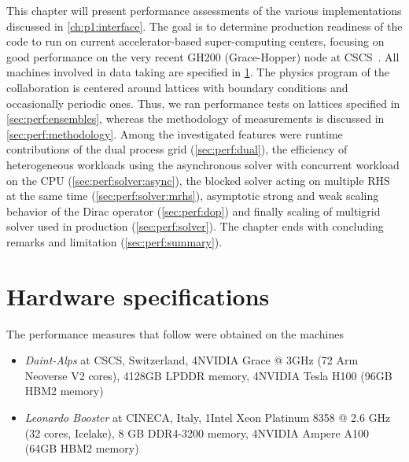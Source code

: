This chapter will present performance assessments of the various implementations discussed in \cref{ch:p1:interface}.
The goal is to determine production readiness of the code to run on current accelerator-based super-computing centers, focusing on good performance on the very recent GH200 (Grace-Hopper) node at CSCS~\cite{fusco2024}.
All machines involved in data taking are specified in \cref{sec:perf:hardware}.
The physics program of the \RCstar collaboration is centered around lattices with \Cstar boundary conditions and occasionally periodic ones.
Thus, we ran performance tests on lattices specified in \cref{sec:perf:ensembles}, whereas the methodology of measurements is discussed in \cref{sec:perf:methodology}.
Among the investigated features were runtime contributions of the dual process grid (\cref{sec:perf:dual}), the efficiency of  heterogeneous workloads using the asynchronous solver with concurrent workload on the CPU (\cref{sec:perf:solver:async}), the blocked solver acting on multiple RHS at the same time (\cref{sec:perf:solver:mrhs}), asymptotic strong and weak scaling behavior of the Dirac operator (\cref{sec:perf:dop}) and finally scaling of multigrid solver used in production (\cref{sec:perf:solver}).
The chapter ends with concluding remarks and limitation (\cref{sec:perf:summary}).

\section{Hardware specifications}
\label{sec:perf:hardware}

\newcommand{\datataking}[1]{The data was taken on \emph{#1}, see \cref{sec:perf:hardware}.}

The performance measures that follow were obtained on the machines
\begin{itemize}
    \item \emph{Daint-Alps} at CSCS, Switzerland, 4\x NVIDIA\textsuperscript{\textregistered} Grace @ 3GHz (72 Arm Neoverse V2 cores), 4\x 128GB LPDDR memory, 4\x NVIDIA\textsuperscript{\textregistered} Tesla\textsuperscript{\textregistered} H100 (96GB HBM2 memory)
    \item \emph{Leonardo Booster} at CINECA, Italy, 1\x Intel\textsuperscript{\textregistered} Xeon\textsuperscript{\textregistered} Platinum 8358 @ 2.6 GHz (32 cores, Icelake), 8 GB DDR4-3200 memory, 4\x NVIDIA\textsuperscript{\textregistered} Ampere A100 (64GB HBM2 memory)~\cite{leonardo:booster}
\end{itemize}

